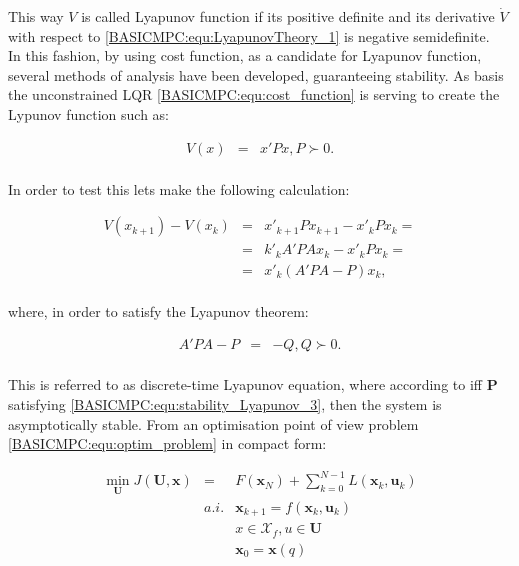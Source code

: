 This way $V$ is called Lyapunov function if its positive definite and its derivative $\dot{V}$ with respect to \ref{BASICMPC:equ:LyapunovTheory_1} is negative semidefinite.\\
	In this fashion, by using cost function, as a candidate for Lyapunov function, several methods of analysis have been developed, guaranteeing stability.	As basis the unconstrained LQR \ref{BASICMPC:equ:cost_function} is serving to create the Lypunov function such as:
	
\begin{equation}
        \begin{array}{rcl}
				V(x)&=&x'Px, P\succ 0.\\
        \end{array}
        \label{BASICMPC:equ:stability_Lyapunov_1}
    \end{equation}
		
	In order to test this lets make the following calculation:
	
	\begin{equation}
        \begin{array}{rcl}
				V(x_{k+1})-V(x_{k})&=&x'_{k+1}Px_{k+1}-x'_{k}Px_{k}=\\
				&=&k'_kA'PAx_k-x'_kPx_k=\\
				&=&x'_k(A'PA-P)x_k,\\
        \end{array}
        \label{BASICMPC:equ:stability_Lyapunov_2}
    \end{equation}
		
		where, in order to satisfy the Lyapunov theorem:
		
		\begin{equation}
        \begin{array}{rcl}
				A'PA-P&=&-Q, Q\succ 0.\\
        \end{array}
        \label{BASICMPC:equ:stability_Lyapunov_3}
    \end{equation}
		
	This is referred to as discrete-time Lyapunov equation, where  according to \cite{borrelli2017predictive} iff $\textbf{P}$ satisfying \ref{BASICMPC:equ:stability_Lyapunov_3}, then the system is asymptotically stable. From an optimisation point of view problem \ref{BASICMPC:equ:optim_problem} in compact form:
	
\begin{equation}
        \begin{array}{rcl}
				\min_{\textbf{U}}J(\textbf{U},\textbf{x})&=&F(\textbf{x}_N)+\sum^{N-1}_{k=0}L(\textbf{x}_k,\textbf{u}_k)\\
					&a.i.&\textbf{x}_{k+1}=f(\textbf{x}_k,\textbf{u}_k) \\
					&&x\in \mathcal{X}_f, u\in \textbf{U}\\
					&&\textbf{x}_0=\textbf{x}(q)\\
        \end{array}
        \label{BASICMPC:equ:optim_stability}
    \end{equation}

